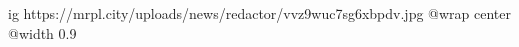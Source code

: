  
 
 
 
 

\ifcmt
  ig https://mrpl.city/uploads/news/redactor/vvz9wuc7sg6xbpdv.jpg
  @wrap center
  @width 0.9
\fi
